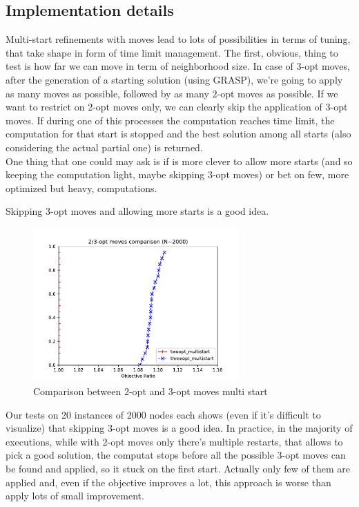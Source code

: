 \subsection{Implementation details}
Multi-start refinements with moves lead to lots of possibilities in terms of
tuning, that take shape in form of time limit management. The first, obvious,
thing to test is how far we can move in term of neighborhood size. In case of
$3$-opt moves, after the generation of a starting solution (using GRASP), we're
going to apply as many moves as possible, followed by as many $2$-opt moves as
possible. If we want to restrict on $2$-opt moves only, we can clearly skip the
application of $3$-opt moves. If during one of this processes the computation
reaches time limit, the computation for that start is stopped and the best
solution among all starts (also considering the actual partial one) is
returned.\\ One thing that one could may ask is if is more clever to allow more
starts (and so keeping the computation light, maybe skipping $3$-opt moves) or
bet on few, more optimized but heavy, computations.

\begin{claim}
    Skipping $3$-opt moves and allowing more starts is a good idea.
\end{claim}

\begin{figure}[h!]
    \centering
    \includegraphics[width=0.7\textwidth]{figures/twothree}
    \caption{Comparison between $2$-opt and $3$-opt moves multi start}
\end{figure}

Our tests on 20 instances of 2000 nodes each shows (even if it's difficult to
visualize) that skipping $3$-opt moves is a good idea. In practice, in the
majority of executions, while with $2$-opt moves only there's multiple restarts,
that allows to pick a good solution, the computat stops before all the
possible $3$-opt moves can be found and applied, so it stuck on the first start.
Actually only few of them are applied and, even if the objective improves a lot,
this approach is worse than apply lots of small improvement.\\

